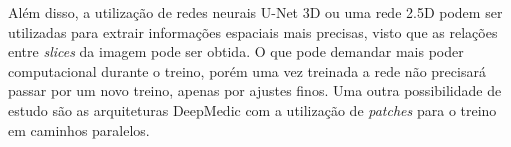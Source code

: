 Além disso, a utilização de redes neurais U-Net 3D ou uma rede 2.5D podem ser utilizadas para extrair informações espaciais mais precisas, visto que as relações entre \textit{slices} da imagem pode ser obtida. O que pode demandar mais poder computacional durante o treino, porém uma vez treinada a rede não precisará passar por um novo treino, apenas por ajustes finos. Uma outra possibilidade de estudo são as arquiteturas DeepMedic com a utilização de \textit{patches} para o treino em caminhos paralelos.

